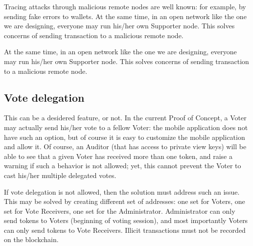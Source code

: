 \documentclass[10pt, letterpaper]{article}
\begin{document}
Tracing attacks through malicious remote nodes are well known: for example, by sending fake errors to wallets. At the same time, in an open network like the one we are designing, everyone may run his/her own Supporter node. This solves concerns of sending transaction to a malicious remote node.
\bigskip

At the same time, in an open network like the one we are designing, everyone may run his/her own Supporter node. This solves concerns of sending transaction to a malicious remote node.
\subsection{Vote delegation}
This can be a desidered feature, or not. In the current Proof of Concept, a Voter may actually send his/her vote to a fellow Voter: the mobile application does not have such an option, but of course it is easy to customize the mobile application and allow it. Of course, an Auditor (that has access to private view keys) will be able to see that a given Voter has received more than one token, and raise a warning if such a behavior is not allowed; yet, this cannot prevent the Voter to cast his/her multiple delegated votes.
\bigskip

If vote delegation is not allowed, then the solution must address such an issue. This may be solved by creating different set of addresses: one set for Voters, one set for Vote Receivers, one set for the Administrator. Administrator can only send tokens to Voters (beginning of voting session), and most importantly Voters can only send tokens to Vote Receivers. Illicit transactions must not be recorded on the blockchain.
\end{document}
